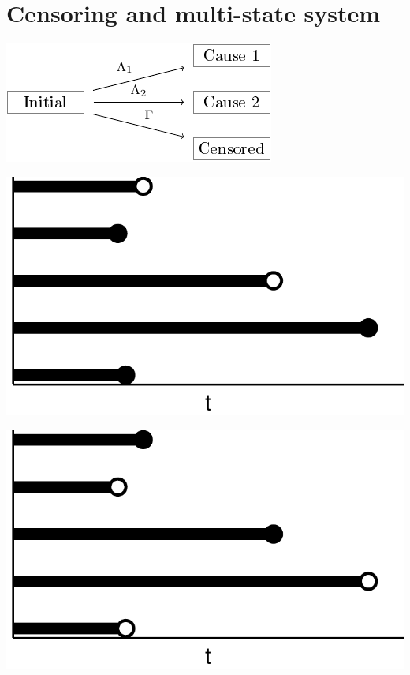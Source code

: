 \documentclass[11pt]{article}
\begin{document}
\section{Censoring and multi-state system}
\label{sec:orgf298cfb}

\begin{center}
\includegraphics[width=.9\linewidth]{comp-risk-observed-w-text.pdf}
\end{center}

\begin{center}
\includegraphics[width=.9\linewidth]{./multi-state-data-1.pdf}
\end{center}

\begin{center}
\includegraphics[width=.9\linewidth]{./multi-state-data-2.pdf}
\end{center}
\end{document}

